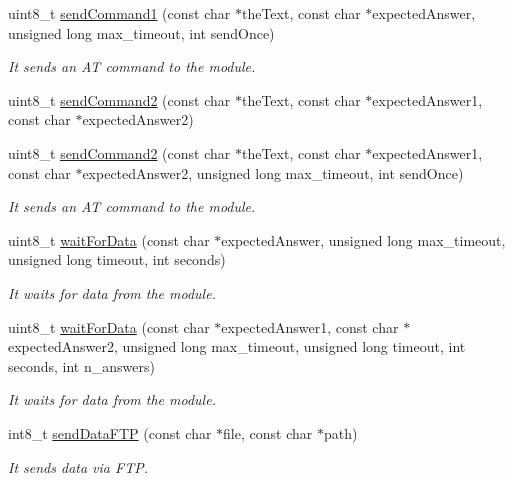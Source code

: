 \begin{DoxyCompactItemize}
uint8\+\_\+t \hyperlink{class_wasp_g_p_r_s___pro__core_a265fd636005fe753adc7529b4f1b9fbc}{send\+Command1} (const char $\ast$the\+Text, const char $\ast$expected\+Answer, unsigned long max\+\_\+timeout, int send\+Once)
\begin{DoxyCompactList}\small\item\em It sends an AT command to the module. \end{DoxyCompactList}\item 
uint8\+\_\+t \hyperlink{class_wasp_g_p_r_s___pro__core_aa08d29826147849eac6c9d19199fe416}{send\+Command2} (const char $\ast$the\+Text, const char $\ast$expected\+Answer1, const char $\ast$expected\+Answer2)
\item 
uint8\+\_\+t \hyperlink{class_wasp_g_p_r_s___pro__core_a8a0df0dd77c9bdfa07ec658de91bc0a3}{send\+Command2} (const char $\ast$the\+Text, const char $\ast$expected\+Answer1, const char $\ast$expected\+Answer2, unsigned long max\+\_\+timeout, int send\+Once)
\begin{DoxyCompactList}\small\item\em It sends an AT command to the module. \end{DoxyCompactList}\item 
uint8\+\_\+t \hyperlink{class_wasp_g_p_r_s___pro__core_a49e3fa010a21ca47c77bce02b1cff6bd}{wait\+For\+Data} (const char $\ast$expected\+Answer, unsigned long max\+\_\+timeout, unsigned long timeout, int seconds)
\begin{DoxyCompactList}\small\item\em It waits for data from the module. \end{DoxyCompactList}\item 
uint8\+\_\+t \hyperlink{class_wasp_g_p_r_s___pro__core_ac14207d3db5e900367598fcbbbdbf6d5}{wait\+For\+Data} (const char $\ast$expected\+Answer1, const char $\ast$expected\+Answer2, unsigned long max\+\_\+timeout, unsigned long timeout, int seconds, int n\+\_\+answers)
\begin{DoxyCompactList}\small\item\em It waits for data from the module. \end{DoxyCompactList}\item 
int8\+\_\+t \hyperlink{class_wasp_g_p_r_s___pro__core_aa51ff7e51c694d9d27c6d56e98c24393}{send\+Data\+F\+TP} (const char $\ast$file, const char $\ast$path)
\begin{DoxyCompactList}\small\item\em It sends data via F\+TP. \end{DoxyCompactList}\item 

\end{DoxyCompactItemize}
